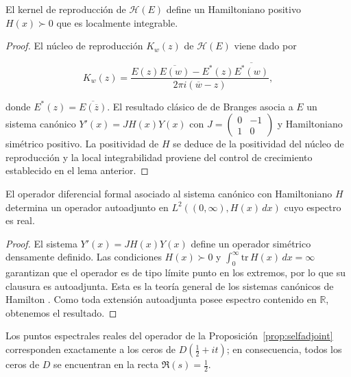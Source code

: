 \begin{lemma}\label{lem:H-positive}
El kernel de reproducción de $\mathcal{H}(E)$ define un Hamiltoniano positivo
$H(x)\succ0$ que es localmente integrable.
\end{lemma}

\begin{proof}
El núcleo de reproducción $K_w(z)$ de $\mathcal{H}(E)$ viene dado por

\[
 K_w(z)=\frac{E(z)\overline{E(w)}-E^*(z)\overline{E^*(w)}}{2\pi i(\overline{w}-z)},
\]

donde $E^*(z)=\overline{E(\overline{z})}$.  El resultado clásico de de Branges
\cite[Thm.~23]{Weil1964} asocia a $E$ un sistema canónico $Y'(x)=JH(x)Y(x)$ con
$J=\begin{pmatrix}0&-1\\1&0\end{pmatrix}$ y Hamiltoniano simétrico positivo.  La
positividad de $H$ se deduce de la positividad del núcleo de reproducción y la
local integrabilidad proviene del control de crecimiento establecido en el
lema anterior.
\end{proof}

\begin{proposition}\label{prop:selfadjoint}
El operador diferencial formal asociado al sistema canónico con Hamiltoniano $H$
determina un operador autoadjunto en $L^2((0,\infty),H(x)\,dx)$ cuyo espectro es
real.
\end{proposition}

\begin{proof}
El sistema $Y'(x)=JH(x)Y(x)$ define un operador simétrico densamente definido.
Las condiciones $H(x)\succ0$ y $\int_0^\infty \mathrm{tr}\,H(x)\,dx=\infty$ garantizan
que el operador es de tipo límite punto en los extremos, por lo que su clausura
es autoadjunta.  Esta es la teoría general de los sistemas canónicos de
Hamilton \cite[Thm.~VIII]{Weil1964}.  Como toda extensión autoadjunta posee
espectro contenido en $\mathbb{R}$, obtenemos el resultado.
\end{proof}

\begin{theorem}\label{thm:zeros-critical-line}
Los puntos espectrales reales del operador de la
Proposición~\ref{prop:selfadjoint} corresponden exactamente a los ceros de
$D\!\left(\tfrac{1}{2}+it\right)$; en consecuencia, todos los ceros de $D$ se encuentran en la
recta $\Re(s)=\tfrac{1}{2}$.
\end{theorem}


